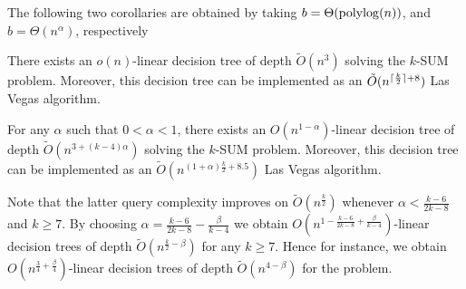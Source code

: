 The following two corollaries are obtained by taking
$b=\Theta(\operatorname{polylog}(n))$, and $b=\Theta(n^{\alpha})$, respectively
\begin{corollary}\label{cor:logn}
There exists an $o(n)$-linear decision tree of
depth $\tilde{O}(n^3)$ solving the \(k\)-SUM problem.
Moreover, this decision tree can be implemented as an
$\tilde{O}(n^{\lceil\frac{k}{2}\rceil+8})$ Las Vegas algorithm.
\end{corollary}
\begin{corollary}\label{cor:ne}
For any $\alpha$ such that $0<\alpha<1$,
there exists an $O(n^{1-\alpha})$-linear decision tree of
depth $\tilde{O} (n^{3+(k-4)\alpha})$ solving the \(k\)-SUM problem.
Moreover, this decision tree can be implemented as an
$\tilde{O}(n^{(1+\alpha)\frac{k}{2} + 8.5})$
Las Vegas algorithm.
\end{corollary}

Note that the latter query complexity improves on $\tilde{O}(n^{\frac{k}{2}})$
whenever \(\alpha < \frac{k-6}{2k-8}\) and $k\ge 7$.
By choosing $\alpha=\frac{k-6}{2k-8}-\frac{\beta}{k-4}$
we obtain $O(n^{1-\frac{k-6}{2k-8}+\frac{\beta}{k-4}})$-linear decision trees
of depth
$\tilde{O}(n^{\frac k2 - \beta})$
for any $k \ge 7$.
Hence for instance, we obtain
$O(n^{\frac{3}{4}+\frac{\beta}{4}})$-linear decision trees of depth
$\tilde{O}(n^{4-\beta})$ for the \dsum[8] problem.

